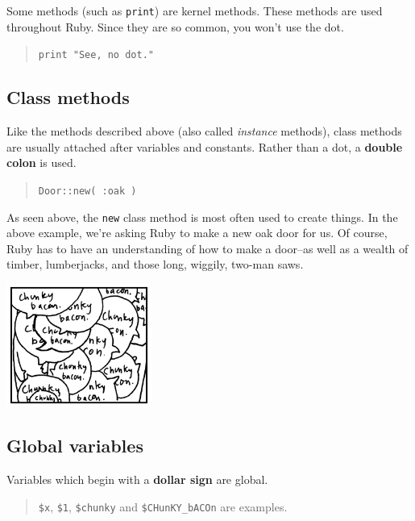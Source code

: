 \documentclass[10pt,twoside]{report}
\begin{document}
Some methods (such as \lstinline[breaklines=true]|print|) are kernel
methods.  These methods are used throughout Ruby.  Since they are so
common, you won't use the dot.

\begin{quote}
\lstinline[breaklines=true]|print "See, no dot."|\end{quote}




\subsection{Class methods}



Like the methods described above (also called {\em instance} methods),
class methods are usually attached after variables and constants.
Rather than a dot, a {\bf double colon} is used.

\begin{quote}
\lstinline[breaklines=true]|Door::new( :oak )|\end{quote}


As seen above, the \lstinline[breaklines=true]|new| class method is
most often used to create things.  In the above example, we're asking
Ruby to make a new oak door for us.  Of course, Ruby has to have an
understanding of how to make a door--as well as a wealth of timber,
lumberjacks, and those long, wiggily, two-man saws.

	\includegraphics[width=0.3575\textwidth]{cache/12.png}




\subsection{Global variables}



Variables which begin with a {\bf dollar sign} are global.

\begin{quote}
\lstinline[breaklines=true]|$x|, \lstinline[breaklines=true]|$1|,
\lstinline[breaklines=true]|$chunky| and
\lstinline[breaklines=true]|$CHunKY_bACOn| are examples.\end{quote}
\end{document}
